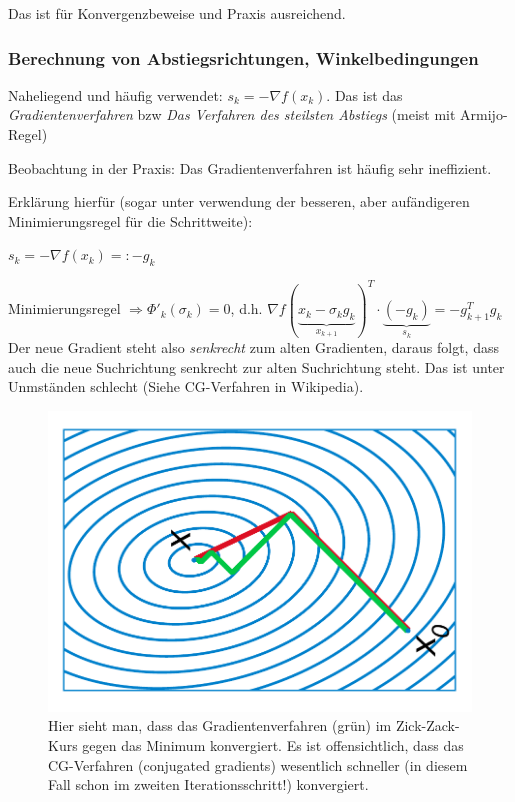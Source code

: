\documentclass[10pt,a4paper]{article}
\begin{document}
Das ist für Konvergenzbeweise und Praxis ausreichend.

\subsubsection{Berechnung von Abstiegsrichtungen, Winkelbedingungen}

Naheliegend und häufig verwendet: $s_k=-\nabla f(x_k)$. Das ist das \emph{Gradientenverfahren} bzw \emph{Das Verfahren des steilsten Abstiegs} (meist mit Armijo-Regel)

Beobachtung in der Praxis: Das Gradientenverfahren ist häufig sehr ineffizient.

Erklärung hierfür (sogar unter verwendung der besseren, aber aufändigeren Minimierungsregel für die Schrittweite):

$s_k=-\nabla f(x_k) =: -g_k$

Minimierungsregel $\Rightarrow \Phi'_k(\sigma_k)=0$, d.h. $\nabla f(\underbrace{x_k-\sigma_k g_k}_{x_{k+1}})^{T} \cdot \underbrace{(-g_k)}_{s_k}=-g_{k+1}^{T}g_k$ Der neue Gradient steht also \emph{senkrecht} zum alten Gradienten, daraus folgt, dass auch die neue Suchrichtung senkrecht zur alten Suchrichtung steht. Das ist unter Unmständen schlecht (Siehe CG-Verfahren in Wikipedia).


\begin{figure}[H]
\includegraphics[width=\textwidth]{images/cg_verfahren_wikipedia}
\caption{Hier sieht man, dass das Gradientenverfahren (grün) im Zick-Zack-Kurs gegen das Minimum konvergiert. Es ist offensichtlich, dass das CG-Verfahren (conjugated gradients) wesentlich schneller (in diesem Fall schon im zweiten Iterationsschritt!) konvergiert.}
\end{figure}
\end{document}
